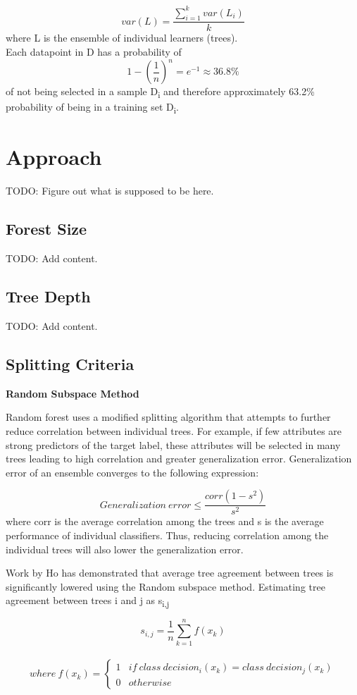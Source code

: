 \documentclass{article} %
\begin{document}
\[ var(L) = \frac{\sum_{i=1}^k var(L_i)}{k}\] where L is the ensemble of individual learners (trees).\\

Each datapoint in D has a probability of \[1-\left(\frac{1}{n}\right)^n = e^{-1} \approx 36.8 \% \] of not being selected in  a sample D\textsubscript{i} and therefore approximately 63.2\% probability of being in a training set D\textsubscript{i}.

\section{Approach}
TODO: Figure out what is supposed to be here.

\subsection{Forest Size}
TODO: Add content.

\subsection{Tree Depth}
TODO: Add content.

\subsection{Splitting Criteria}

\textbf{Random Subspace Method}

Random forest uses a modified splitting algorithm that attempts to further reduce correlation between individual trees. For example, if few attributes are strong predictors of the target label, these attributes will be selected in many trees leading to high correlation and greater generalization error.  Generalization error of an ensemble converges to the following expression:

\[Generalization\ error \leq \frac{corr(1-s^2)}{s^2}\] where corr is the average correlation among the trees and s is the average performance of individual classifiers. Thus, reducing correlation among the individual trees will also lower the generalization error.

 Work by Ho has demonstrated that average tree agreement between trees is significantly lowered using the Random subspace method. \cite{Ho98}
Estimating tree agreement between trees i and j as s\textsubscript{i,j}

\[ s_{i,j} = \frac{1}{n}\sum_{k=1}^{n}f(x_k)\]
\
\[ where \ f(x_k) = \begin{cases}
      1 & if\ class\ decision_i(x_k) = class \ decision_j(x_k) \\
      0 & otherwise
   \end{cases}
\]
\end{document}

